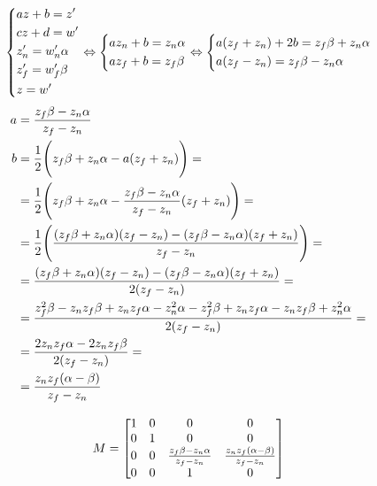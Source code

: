 \[
    \left\{
    \begin{aligned}
        & az + b = z' \\
        & cz + d = w' \\
        & z'_n = w'_n \alpha \\
        & z'_f = w'_f \beta \\
        & z = w' \\
    \end{aligned}
    \right.
    \Leftrightarrow
    \left\{
    \begin{aligned}
        & az_n + b = z_n \alpha \\
        & az_f + b = z_f \beta \\
    \end{aligned}
    \right.
    \Leftrightarrow
    \left\{
    \begin{aligned}
        & a(z_f + z_n) + 2b = z_f \beta + z_n \alpha \\
        & a(z_f - z_n) = z_f \beta - z_n \alpha \\
    \end{aligned}
    \right.
\]
\begin{align*}
    a & = \frac{z_f \beta - z_n \alpha}{z_f - z_n} \\
    b
    & = \frac{1}{2} \Biggl( z_f \beta + z_n \alpha - a(z_f + z_n) \Biggr) = \\
    & = \frac{1}{2} \Biggl( z_f \beta + z_n \alpha - \frac{z_f \beta - z_n \alpha}{z_f - z_n} (z_f + z_n) \Biggr) = \\
    & = \frac{1}{2} \Biggl( \frac{(z_f \beta + z_n \alpha) (z_f - z_n) - (z_f \beta - z_n \alpha) (z_f + z_n)}{z_f - z_n} \Biggr) = \\
    & = \frac{(z_f \beta + z_n \alpha) (z_f - z_n) - (z_f \beta - z_n \alpha) (z_f + z_n)}{2(z_f - z_n)} = \\
    & = \frac{z_f^2 \beta - z_n z_f \beta + z_n z_f \alpha - z_n^2 \alpha - z_f^2 \beta + z_n z_f \alpha - z_n z_f \beta + z_n^2 \alpha}{2(z_f - z_n)} = \\
    & = \frac{2 z_n z_f \alpha - 2 z_n z_f \beta}{2(z_f - z_n)} = \\
    & = \frac{z_n z_f (\alpha - \beta)}{z_f - z_n} \\
\end{align*}

\[
    M =
    \begin{bmatrix}
        1 & 0 & 0 & 0 \\
        0 & 1 & 0 & 0 \\
        0 & 0 & \frac{z_f \beta - z_n \alpha}{z_f - z_n} & \frac{z_n z_f (\alpha - \beta)}{z_f - z_n} \\
        0 & 0 & 1 & 0 \\
    \end{bmatrix}
\]

